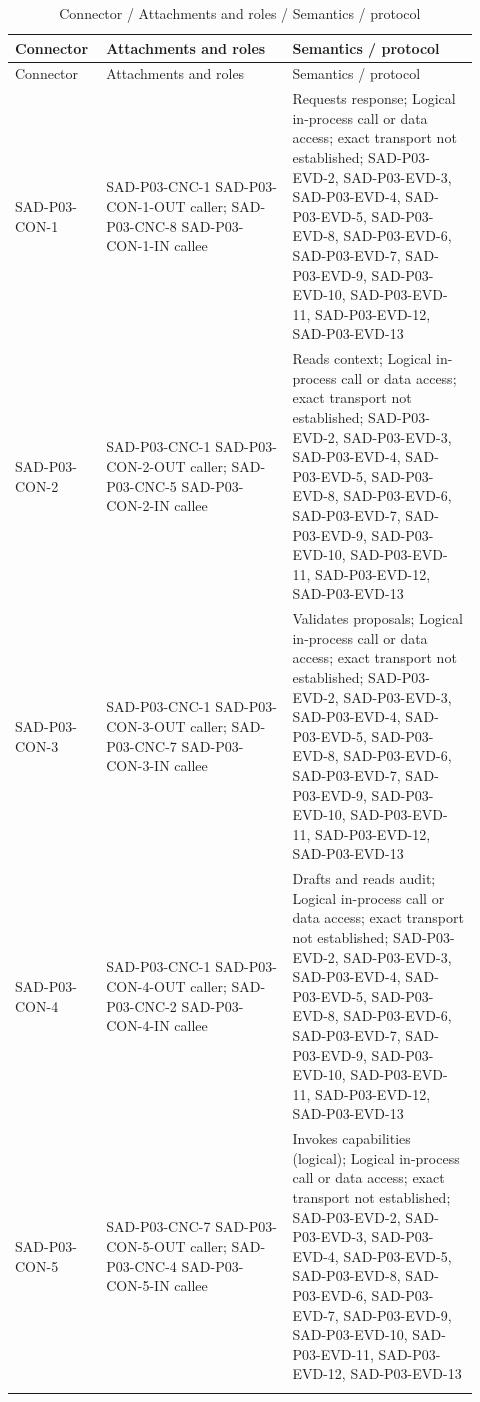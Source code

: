 \documentclass[10pt,letterpaper]{article}
\begin{document}
\begin{longtable}{@{}>{\raggedright\arraybackslash}p{0.16\linewidth}>{\raggedright\arraybackslash}p{0.38\linewidth}>{\raggedright\arraybackslash}p{0.38\linewidth}@{}}
\caption{Connector / Attachments and roles / Semantics / protocol}\\
\toprule Connector & Attachments and roles & Semantics / protocol\\\midrule\endfirsthead
\toprule Connector & Attachments and roles & Semantics / protocol\\\midrule\endhead
SAD-P03-CON-1 & SAD-P03-CNC-1 SAD-P03-CON-1-OUT caller; SAD-P03-CNC-8 SAD-P03-CON-1-IN callee & Requests response; Logical in-process call or data access; exact transport not established; SAD-P03-EVD-2, SAD-P03-EVD-3, SAD-P03-EVD-4, SAD-P03-EVD-5, SAD-P03-EVD-8, SAD-P03-EVD-6, SAD-P03-EVD-7, SAD-P03-EVD-9, SAD-P03-EVD-10, SAD-P03-EVD-11, SAD-P03-EVD-12, SAD-P03-EVD-13\\\addlinespace
SAD-P03-CON-2 & SAD-P03-CNC-1 SAD-P03-CON-2-OUT caller; SAD-P03-CNC-5 SAD-P03-CON-2-IN callee & Reads context; Logical in-process call or data access; exact transport not established; SAD-P03-EVD-2, SAD-P03-EVD-3, SAD-P03-EVD-4, SAD-P03-EVD-5, SAD-P03-EVD-8, SAD-P03-EVD-6, SAD-P03-EVD-7, SAD-P03-EVD-9, SAD-P03-EVD-10, SAD-P03-EVD-11, SAD-P03-EVD-12, SAD-P03-EVD-13\\\addlinespace
SAD-P03-CON-3 & SAD-P03-CNC-1 SAD-P03-CON-3-OUT caller; SAD-P03-CNC-7 SAD-P03-CON-3-IN callee & Validates proposals; Logical in-process call or data access; exact transport not established; SAD-P03-EVD-2, SAD-P03-EVD-3, SAD-P03-EVD-4, SAD-P03-EVD-5, SAD-P03-EVD-8, SAD-P03-EVD-6, SAD-P03-EVD-7, SAD-P03-EVD-9, SAD-P03-EVD-10, SAD-P03-EVD-11, SAD-P03-EVD-12, SAD-P03-EVD-13\\\addlinespace
SAD-P03-CON-4 & SAD-P03-CNC-1 SAD-P03-CON-4-OUT caller; SAD-P03-CNC-2 SAD-P03-CON-4-IN callee & Drafts and reads audit; Logical in-process call or data access; exact transport not established; SAD-P03-EVD-2, SAD-P03-EVD-3, SAD-P03-EVD-4, SAD-P03-EVD-5, SAD-P03-EVD-8, SAD-P03-EVD-6, SAD-P03-EVD-7, SAD-P03-EVD-9, SAD-P03-EVD-10, SAD-P03-EVD-11, SAD-P03-EVD-12, SAD-P03-EVD-13\\\addlinespace
SAD-P03-CON-5 & SAD-P03-CNC-7 SAD-P03-CON-5-OUT caller; SAD-P03-CNC-4 SAD-P03-CON-5-IN callee & Invokes capabilities (logical); Logical in-process call or data access; exact transport not established; SAD-P03-EVD-2, SAD-P03-EVD-3, SAD-P03-EVD-4, SAD-P03-EVD-5, SAD-P03-EVD-8, SAD-P03-EVD-6, SAD-P03-EVD-7, SAD-P03-EVD-9, SAD-P03-EVD-10, SAD-P03-EVD-11, SAD-P03-EVD-12, SAD-P03-EVD-13\\\addlinespace

\end{longtable}
\end{document}
